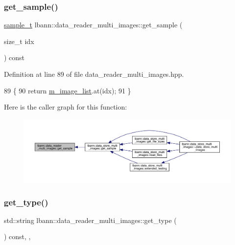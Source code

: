\subsubsection{\texorpdfstring{get\+\_\+sample()}{get\_sample()}}
{\footnotesize\ttfamily \hyperlink{classlbann_1_1data__reader__multi__images_a6cbb30001dd633b0d810c417cbbf441e}{sample\+\_\+t} lbann\+::data\+\_\+reader\+\_\+multi\+\_\+images\+::get\+\_\+sample (\begin{DoxyParamCaption}\item[{size\+\_\+t}]{idx }\end{DoxyParamCaption}) const\hspace{0.3cm}{\ttfamily [inline]}}



Definition at line 89 of file data\+\_\+reader\+\_\+multi\+\_\+images.\+hpp.


\begin{DoxyCode}
89                                         \{
90     \textcolor{keywordflow}{return} \hyperlink{classlbann_1_1data__reader__multi__images_a6d8e2d161c9efff1ac70f847b4a7e9d0}{m\_image\_list}.at(idx);
91   \}
\end{DoxyCode}
Here is the caller graph for this function\+:\nopagebreak
\begin{figure}[H]
\begin{center}
\leavevmode
\includegraphics[width=350pt]{classlbann_1_1data__reader__multi__images_ab940ea9e62d5fac6d6c1b209404abe83_icgraph}
\end{center}
\end{figure}
\mbox{\label{classlbann_1_1data__reader__multi__images_a9939a88a40caf7b2a27de08deca54ac1}} 
\subsubsection{\texorpdfstring{get\+\_\+type()}{get\_type()}}
{\footnotesize\ttfamily std\+::string lbann\+::data\+\_\+reader\+\_\+multi\+\_\+images\+::get\+\_\+type (\begin{DoxyParamCaption}{ }\end{DoxyParamCaption}) const\hspace{0.3cm}{\ttfamily [inline]}, {\ttfamily [override]}, {\ttfamily [virtual]}}

